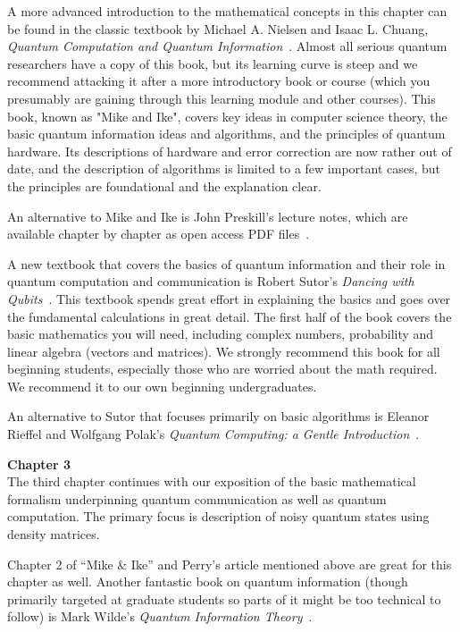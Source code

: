A more advanced introduction to the mathematical concepts in this chapter can be found in the classic textbook by Michael A. Nielsen and Isaac L. Chuang, \emph{Quantum Computation and Quantum Information}~\cite{nielsen-chuang:qci}. Almost all serious quantum researchers have a copy of this book, but its learning curve is steep and we recommend attacking it after a more introductory book or course (which you presumably are gaining through this learning module and other courses). This book, known as "Mike and Ike", covers key ideas in computer science theory, the basic quantum information ideas and algorithms, and the principles of quantum hardware. Its descriptions of hardware and error correction are now rather out of date, and the description of algorithms is limited to a few important cases, but the principles are foundational and the explanation clear.

An alternative to Mike and Ike is John Preskill's lecture notes, which are available chapter by chapter as open access PDF files~\cite{preskill:PH-CS219}.

A new textbook that covers the basics of quantum information and their role in quantum computation and communication is Robert Sutor's \emph{Dancing with Qubits}~\cite{sutor19:dancing}. This textbook spends great effort in explaining the basics and goes over the fundamental calculations in great detail. The first half of the book covers the basic mathematics you will need, including complex numbers, probability and linear algebra (vectors and matrices). We strongly recommend this book for all beginning students, especially those who are worried about the math required. We recommend it to our own beginning undergraduates.

An alternative to Sutor that focuses primarily on basic algorithms is Eleanor Rieffel and Wolfgang Polak's \emph{Quantum Computing: a Gentle Introduction}~\cite{rieffel2011quantum}.

{\bf Chapter 3}\\

The third chapter continues with our exposition of the basic mathematical formalism underpinning quantum communication as well as quantum computation. The primary focus is description of noisy quantum states using density matrices.

Chapter 2 of “Mike \& Ike” and Perry’s article mentioned above are great for this chapter as well. Another fantastic book on quantum information (though primarily targeted at graduate students so parts of it might be too technical to follow) is Mark Wilde's \emph{Quantum Information Theory}~\cite{wilde2013quantum}.

